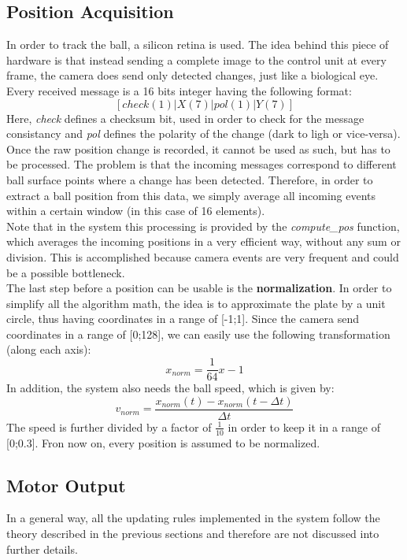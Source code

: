 \documentclass{article}
\begin{document}
\subsection{Position Acquisition}
In order to track the ball, a silicon retina is used. The idea behind this piece of hardware is that instead sending a complete image to the control unit at every frame, the camera does send only detected changes, just like a biological eye. Every received message is a 16 bits integer having the following format:
\[
[ check (1) | X (7) | pol (1) | Y (7) ]
\]
Here, \textit{check} defines a checksum bit, used in order to check for the message consistancy and \textit{pol} defines the polarity of the change (dark to ligh or vice-versa). \\
Once the raw position change is recorded, it cannot be used as such, but has to be processed. The problem is that  the incoming messages correspond to different ball surface points where a change has been detected. Therefore, in order to extract a ball position from this data, we simply average all incoming events within a certain window (in this case of 16 elements).\\
Note that in the system this processing is provided by the \textit{compute\_pos} function, which averages the incoming positions in a very efficient way, without any sum or division. This is accomplished because camera events are very frequent and could be a possible bottleneck.\\

The last step before a position can be usable is the \textbf{normalization}. In order to simplify all the algorithm math, the idea is to approximate the plate by a unit circle, thus having coordinates in a range of [-1;1]. Since the camera send coordinates in a range of [0;128], we can easily use the following transformation (along each axis): 
\[
	x_{norm} = \frac{1}{64}x - 1
\]
In addition, the system also needs the ball speed, which is given by:
\[
	v_{norm} = \frac{x_{norm}(t) - x_{norm}(t - \Delta t)}{\Delta t}
\]
The speed is further divided by a factor of \(\frac{1}{10}\) in order to keep it in a range of [0;0.3]. Fron now on, every position is assumed to be normalized.

\subsection{Motor Output}
In a general way, all the updating rules implemented in the system follow the theory described in the previous sections and therefore are not discussed into further details.\\
\end{document}
